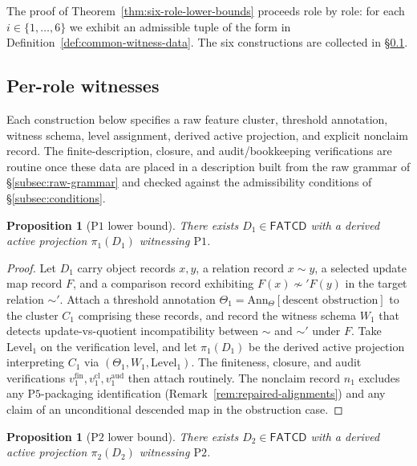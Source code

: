 \documentclass[11pt]{article}
\newtheorem{proposition}[theorem]{Proposition}
\theoremstyle{definition}
\newcommand{\FATCD}{\ensuremath{\mathsf{FATCD}}}
\newcommand{\Pone}{\ensuremath{\mathrm{P1}}}
\newcommand{\Ptwo}{\ensuremath{\mathrm{P2}}}
\newcommand{\Pfive}{\ensuremath{\mathrm{P5}}}
\begin{document}
The proof of Theorem~\ref{thm:six-role-lower-bounds} proceeds role by
role: for each \(i \in \{1,\ldots,6\}\) we exhibit an admissible
tuple of the form in Definition~\ref{def:common-witness-data}. The
six constructions are collected in
\S\ref{subsec:per-role-witnesses}.

\subsection{Per-role witnesses}\label{subsec:per-role-witnesses}

Each construction below specifies a raw feature cluster, threshold
annotation, witness schema, level assignment, derived active
projection, and explicit nonclaim record. The finite-description,
closure, and audit/bookkeeping verifications are routine once these
data are placed in a description built from the raw grammar of
\S\ref{subsec:raw-grammar} and checked against the admissibility
conditions of \S\ref{subsec:conditions}.

\begin{proposition}[\Pone{} lower bound]\label{prop:p1-witness}
There exists \(D_1 \in \FATCD{}\) with a derived active projection
\(\pi_1(D_1)\) witnessing \Pone{}.
\end{proposition}

\begin{proof}
Let \(D_1\) carry object records \(x, y\), a relation record
\(x \sim y\), a selected update map record \(F\), and a comparison
record exhibiting \(F(x) \not\sim' F(y)\) in the target relation
\(\sim'\). Attach a threshold annotation
\(\Theta_1 = \mathrm{Ann}_\Theta[\text{descent obstruction}]\) to the
cluster \(C_1\) comprising these records, and record the witness schema
\(W_1\) that detects update-vs-quotient incompatibility between \(\sim\)
and \(\sim'\) under \(F\). Take \(\mathrm{Level}_1\) on the verification
level, and let \(\pi_1(D_1)\) be the derived active projection
interpreting \(C_1\) via \((\Theta_1,W_1,\mathrm{Level}_1)\). The
finiteness, closure, and audit verifications \(v_1^{\mathrm{fin}},
v_1^{\mathrm{cl}}, v_1^{\mathrm{aud}}\) then attach routinely. The
nonclaim record \(n_1\) excludes any \Pfive{}-packaging
identification (Remark~\ref{rem:repaired-alignments}) and any claim of
an unconditional descended map in the obstruction case.
\end{proof}

\begin{proposition}[\Ptwo{} lower bound]\label{prop:p2-witness}
There exists \(D_2 \in \FATCD{}\) with a derived active projection
\(\pi_2(D_2)\) witnessing \Ptwo{}.
\end{proposition}
\end{document}
